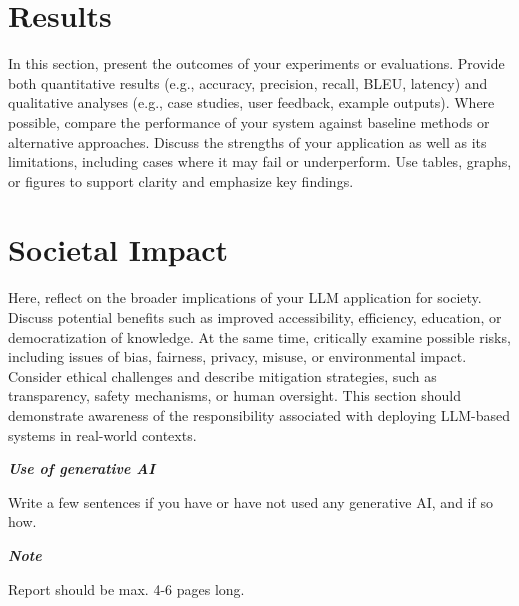 \documentclass[a4paper,10pt]{article}
\begin{document}
\section{Results}
In this section, present the outcomes of your experiments or evaluations. Provide both quantitative results (e.g., accuracy, precision, recall, BLEU, latency) and qualitative analyses (e.g., case studies, user feedback, example outputs). Where possible, compare the performance of your system against baseline methods or alternative approaches. Discuss the strengths of your application as well as its limitations, including cases where it may fail or underperform. Use tables, graphs, or figures to support clarity and emphasize key findings.

\section{Societal Impact}
Here, reflect on the broader implications of your LLM application for society. Discuss potential benefits such as improved accessibility, efficiency, education, or democratization of knowledge. At the same time, critically examine possible risks, including issues of bias, fairness, privacy, misuse, or environmental impact. Consider ethical challenges and describe mitigation strategies, such as transparency, safety mechanisms, or human oversight. This section should demonstrate awareness of the responsibility associated with deploying LLM-based systems in real-world contexts.

	
\hfill \break
\textit{\textbf{Use of generative AI}}

Write a few sentences if you have or have not used any generative AI, and if so how.


\hfill \break
\textit{\textbf{Note}}

Report should be max. 4-6 pages long.

	
\begin{thebibliography}{1}

		
\end{thebibliography}

	
	
%	
%	
%	
\end{document}
